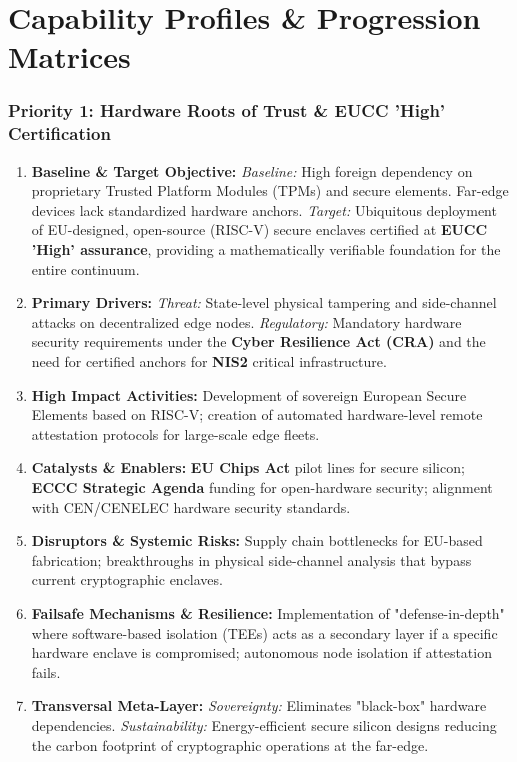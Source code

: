 \documentclass[12pt,a4paper]{report}
\begin{document}
\chapter{Capability Profiles \& Progression Matrices}

\subsection*{Priority 1: Hardware Roots of Trust \& EUCC 'High' Certification}

\begin{enumerate}
\item \textbf{Baseline \& Target Objective:}
\textit{Baseline:} High foreign dependency on proprietary Trusted Platform Modules (TPMs) and secure elements. Far-edge devices lack standardized hardware anchors.
\textit{Target:} Ubiquitous deployment of EU-designed, open-source (RISC-V) secure enclaves certified at \textbf{EUCC 'High' assurance}, providing a mathematically verifiable foundation for the entire continuum.

\item \textbf{Primary Drivers:} 
\textit{Threat:} State-level physical tampering and side-channel attacks on decentralized edge nodes. 
\textit{Regulatory:} Mandatory hardware security requirements under the \textbf{Cyber Resilience Act (CRA)} and the need for certified anchors for \textbf{NIS2} critical infrastructure.

\item \textbf{High Impact Activities:} 
Development of sovereign European Secure Elements based on RISC-V; creation of automated hardware-level remote attestation protocols for large-scale edge fleets.

\item \textbf{Catalysts \& Enablers:} 
\textbf{EU Chips Act} pilot lines for secure silicon; \textbf{ECCC Strategic Agenda} funding for open-hardware security; alignment with CEN/CENELEC hardware security standards.

\item \textbf{Disruptors \& Systemic Risks:} 
Supply chain bottlenecks for EU-based fabrication; breakthroughs in physical side-channel analysis that bypass current cryptographic enclaves.

\item \textbf{Failsafe Mechanisms \& Resilience:} 
Implementation of "defense-in-depth" where software-based isolation (TEEs) acts as a secondary layer if a specific hardware enclave is compromised; autonomous node isolation if attestation fails.

\item \textbf{Transversal Meta-Layer:} 
\textit{Sovereignty:} Eliminates "black-box" hardware dependencies. \textit{Sustainability:} Energy-efficient secure silicon designs reducing the carbon footprint of cryptographic operations at the far-edge.

\end{enumerate}
\end{document}
